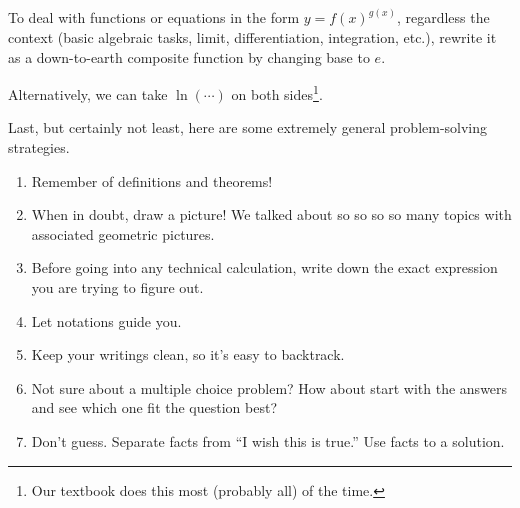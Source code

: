 \documentclass[../main.tex]{subfiles}
\begin{document}
To deal with functions or equations in the form \(y = f(x)^{g(x)}\), regardless the context (basic algebraic tasks, limit, differentiation, integration, etc.), rewrite it as a down-to-earth composite function by changing base to \(e\).


Alternatively, we can take \(\ln( \cdots{} )\) on both sides\footnote{Our textbook does this most (probably all) of the time.}.


\clearpage

Last, but certainly not least, here are some extremely general  problem-solving strategies.

\begin{enumerate}
  \item Remember  of definitions and theorems!
  \item When in doubt, draw a picture! We talked about so so so so many topics with associated geometric pictures.
  \item Before going into any technical calculation, write down the exact expression you are trying to figure out.
  \item Let notations guide you. 
  \item Keep your writings clean, so it's easy to backtrack.
  \item Not sure about a multiple choice problem? How about start with the answers and see which one fit the question best?
  \item Don't guess. Separate facts from \enquote{I wish this is true.} Use facts to  a solution.
\end{enumerate}
\end{document}
